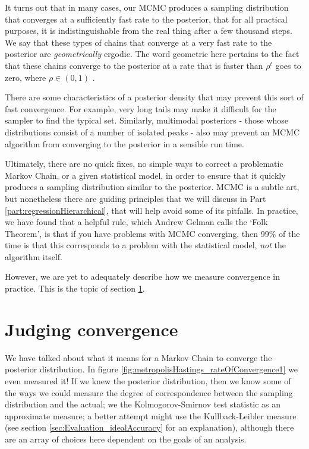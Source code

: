 \documentclass[11pt,fullpage]{book}
\begin{document}
It turns out that in many cases, our MCMC produces a sampling distribution that converges at a sufficiently fast rate to the posterior, that for all practical purposes, it is indistinguishable from the real thing after a few thousand steps. We say that these types of chains that converge at a very fast rate to the posterior are \textit{geometrically} ergodic. The word geometric here pertains to the fact that these chains converge to the posterior at a rate that is faster than $\rho^t$ goes to zero, where $\rho\in(0,1)$ \cite{saidi2006stationarity}.

There are some characteristics of a posterior density that may prevent this sort of fast convergence. For example, very long tails may make it difficult for the sampler to find the typical set. Similarly, multimodal posteriors - those whose distributions consist of a number of isolated peaks - also may prevent an MCMC algorithm from converging to the posterior in a sensible run time.

Ultimately, there are no quick fixes, no simple ways to correct a problematic Markov Chain, or a given statistical model, in order to ensure that it quickly produces a sampling distribution similar to the posterior. MCMC is a subtle art, but nonetheless there are guiding principles that we will discuss in Part \ref{part:regressionHierarchical}, that will help avoid some of its pitfalls. In practice, we have found that a helpful rule, which Andrew Gelman calls the `Folk Theorem', is that if you have problems with MCMC converging, then 99\% of the time is that this corresponds to a problem with the statistical model, \textit{not} the algorithm itself.

However, we are yet to adequately describe how we measure convergence in practice. This is the topic of section \ref{sec:metropolisHastings_convergence}.

\section{Judging convergence}\label{sec:metropolisHastings_convergence}
We have talked about what it means for a Markov Chain to converge the posterior distribution. In figure \ref{fig:metropolisHastings_rateOfConvergence1} we even measured it! If we knew the posterior distribution, then we know some of the ways we could measure the degree of correspondence between the sampling distribution and the actual; we the Kolmogorov-Smirnov test statistic as an approximate measure; a better attempt might use the Kullback-Leibler measure (see section \ref{sec:Evaluation_idealAccuracy} for an explanation), although there are an array of choices here dependent on the goals of an analysis. 
\end{document}
